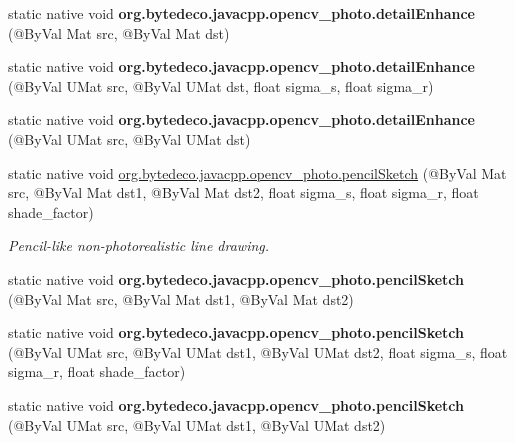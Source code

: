 \begin{DoxyCompactItemize}
\mbox{\label{group__photo__render_ga9cc427e95b443b908ba43d788fdd4e16}} 
static native void {\bfseries org.\+bytedeco.\+javacpp.\+opencv\+\_\+photo.\+detail\+Enhance} (@By\+Val Mat src, @By\+Val Mat dst)
\item 
\mbox{\label{group__photo__render_ga4cdb911a3ef86b9c4cb5d3d989ad9e98}} 
static native void {\bfseries org.\+bytedeco.\+javacpp.\+opencv\+\_\+photo.\+detail\+Enhance} (@By\+Val U\+Mat src, @By\+Val U\+Mat dst, float sigma\+\_\+s, float sigma\+\_\+r)
\item 
\mbox{\label{group__photo__render_gac1fbe57bf2fd633a8ed33b10b6ba8f42}} 
static native void {\bfseries org.\+bytedeco.\+javacpp.\+opencv\+\_\+photo.\+detail\+Enhance} (@By\+Val U\+Mat src, @By\+Val U\+Mat dst)
\item 
static native void \hyperlink{group__photo__render_gafec8b96cb1b707bb2a5b2b2d3957f92d}{org.\+bytedeco.\+javacpp.\+opencv\+\_\+photo.\+pencil\+Sketch} (@By\+Val Mat src, @By\+Val Mat dst1, @By\+Val Mat dst2, float sigma\+\_\+s, float sigma\+\_\+r, float shade\+\_\+factor)
\begin{DoxyCompactList}\small\item\em Pencil-\/like non-\/photorealistic line drawing. \end{DoxyCompactList}\item 
\mbox{\label{group__photo__render_gac6f08041379b7ae605137563072422f4}} 
static native void {\bfseries org.\+bytedeco.\+javacpp.\+opencv\+\_\+photo.\+pencil\+Sketch} (@By\+Val Mat src, @By\+Val Mat dst1, @By\+Val Mat dst2)
\item 
\mbox{\label{group__photo__render_ga1d8434c367be086e44d67bcd5faf117c}} 
static native void {\bfseries org.\+bytedeco.\+javacpp.\+opencv\+\_\+photo.\+pencil\+Sketch} (@By\+Val U\+Mat src, @By\+Val U\+Mat dst1, @By\+Val U\+Mat dst2, float sigma\+\_\+s, float sigma\+\_\+r, float shade\+\_\+factor)
\item 
\mbox{\label{group__photo__render_gafa61da423d64c53bbe572b2d53fdda0a}} 
static native void {\bfseries org.\+bytedeco.\+javacpp.\+opencv\+\_\+photo.\+pencil\+Sketch} (@By\+Val U\+Mat src, @By\+Val U\+Mat dst1, @By\+Val U\+Mat dst2)

\end{DoxyCompactItemize}
